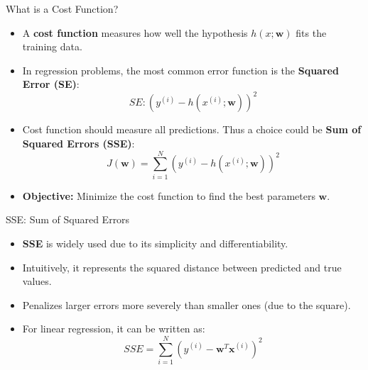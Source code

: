 \documentclass[serif, aspectratio=169]{beamer}
\begin{document}
\begin{frame}{What is a Cost Function?}
    \begin{itemize}
        \item A \textbf{cost function} measures how well the hypothesis \( h(x; \mathbf{w}) \) fits the training data.
        \item In regression problems, the most common error function is the \textbf{Squared Error (SE)}:
            \[
            SE: \left( y^{(i)} - h(x^{(i)}; \mathbf{w}) \right)^2
            \]
        \item Cost function should measure all predictions. Thus a choice could be \textbf{Sum of Squared Errors (SSE)}:
        \[
        J(\mathbf{w}) = \sum_{i=1}^{N} \left( y^{(i)} - h(x^{(i)}; \mathbf{w}) \right)^2
        \]
        \item \textbf{Objective:} Minimize the cost function to find the best parameters \( \mathbf{w} \).

    \end{itemize}

\end{frame}

\begin{frame}{SSE: Sum of Squared Errors}
    \begin{itemize}
        \item \textbf{SSE} is widely used due to its simplicity and differentiability.
        \item Intuitively, it represents the squared distance between predicted and true values.
        \item Penalizes larger errors more severely than smaller ones (due to the square).
        \item For linear regression, it can be written as:
        \[
        SSE = \sum_{i=1}^{N} \left( y^{(i)} - \mathbf{w}^T \mathbf{x}^{(i)} \right)^2
        \]
    \end{itemize}
\end{frame}
\end{document}
